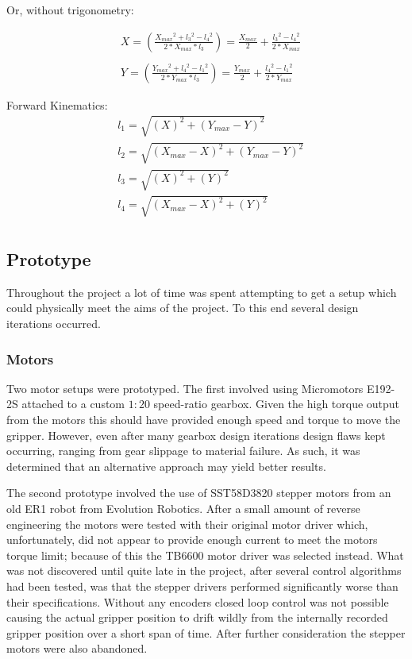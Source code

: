 \documentclass[conference]{IEEEtran}
\begin{document}
Or, without trigonometry:

\begin{equation} \label{inverse_kinematics_1}
\begin{aligned}
&X = \left(\frac{X_{max}{}^2 + l_3{}^2 - l_4{}^2}{2*X_{max}*l_3}\right) = \frac{X_{max}}{2} + \frac{l_3{}^2 - l_4{}^2}{2*X_{max}}\\ \\
&Y = \left(\frac{Y_{max}{}^2 + l_4{}^2 - l_1{}^2}{2*Y_{max}*l_3}\right) = \frac{Y_{max}}{2} + \frac{l_4{}^2 - l_1{}^2}{2*Y_{max}}
\end{aligned}
\end{equation}

Forward Kinematics:
\begin{equation} \label{forward_kinematics_1}
\begin{aligned}
&l_1 = \sqrt{\left(X\right)^2 + \left(Y_{max}-Y\right)^2}\\
&l_2 = \sqrt{\left(X_{max}-X\right)^2 + \left(Y_{max}-Y\right)^2}\\
&l_3 = \sqrt{\left(X\right)^2 + \left(Y\right)^2}\\
&l_4 = \sqrt{\left(X_{max}-X\right)^2 + \left(Y\right)^2}\\
\end{aligned}
\end{equation}
\subsection{Prototype}
Throughout the project a lot of time was spent attempting to get a setup which could physically meet the aims of the project. To this end several design iterations occurred.

\subsubsection{Motors}
Two motor setups were prototyped. The first involved using Micromotors E192-2S attached to a custom $1:20$ speed-ratio gearbox. Given the high torque output from the motors this should have provided enough speed and torque to move the gripper. However, even after many gearbox design iterations design flaws kept occurring, ranging from gear slippage to material failure. As such, it was determined that an alternative approach may yield better results.

The second prototype involved the use of SST58D3820 stepper motors from an old ER1 robot from Evolution Robotics. After a small amount of reverse engineering the motors were tested with their original motor driver which, unfortunately, did not appear to provide enough current to meet the motors torque limit; because of this the TB6600 motor driver was selected instead. What was not discovered until quite late in the project, after several control algorithms had been tested, was that the stepper drivers performed significantly worse than their specifications. Without any encoders closed loop control was not possible causing the actual gripper position to drift wildly from the internally recorded gripper position over a short span of time. After further consideration the stepper motors were also abandoned.
\end{document}
